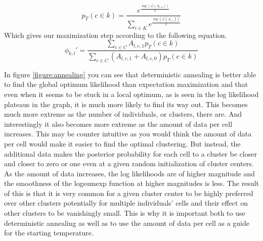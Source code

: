 \begin{equation}
p_T(c \in k) =  \frac{e^{\frac{\log(\mathcal{L}(A_{c,k}))}{T}}}{\sum_{i \in K} e^{\frac{\log(\mathcal{L}(A_{c,i}))}{T}}}
\end{equation}
Which gives our maximization step according to the following equation.
\begin{equation}
\phi_{k,l}' = \frac{\sum_{c \in C} A_{l,c,1} p_T(c \in k)}{\sum_{c \in C}(A_{l,c,1} + A_{l,c,0})p_T(c \in k)}
\end{equation}

\par{
In figure \ref{figure:annealing} you can see that deterministic annealing is better able to find the global optimum likelihood than expectation maximization and that even when it seems to be stuck in a local optimum, as is seen in the log likelihood plateaus in the graph, it is much more likely to find its way out. This becomes much more extreme as the number of individuals, or clusters, there are. And interestingly it also becomes more extreme as the amount of data per cell increases. This may be counter intuitive as you would think the amount of data per cell would make it easier to find the optimal clustering. But instead, the additional data makes the posterior probability for each cell to a cluster be closer and closer to zero or one even at a given random initialization of cluster centers. As the amount of data increases, the log likelihoods are of higher magnitude and the smoothness of the logsumexp function at higher magnitudes is less. The result of this is that it is very common for a given cluster center to be highly preferred over other clusters potentially for multiple individuals' cells and their effect on other clusters to be vanishingly small. This is why it is important both to use deterministic annealing as well as to use the amount of data per cell as a guide for the starting temperature.
}


